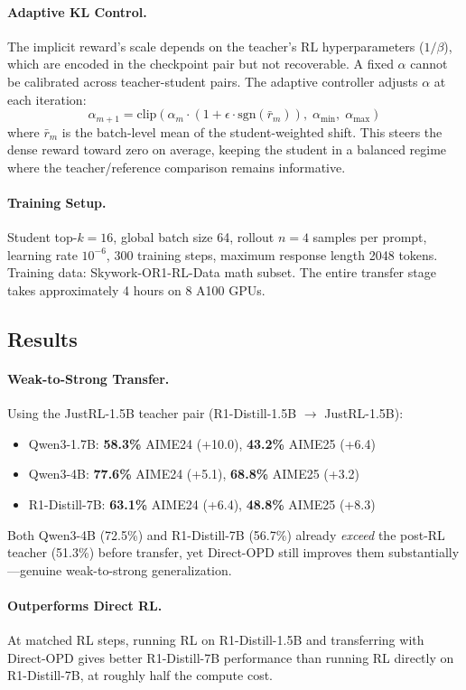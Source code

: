 \documentclass[11pt,a4paper]{article}
\begin{document}
\paragraph{Adaptive KL Control.} The implicit reward's scale depends on the teacher's RL hyperparameters ($1/\beta$), which are encoded in the checkpoint pair but not recoverable. A fixed $\alpha$ cannot be calibrated across teacher-student pairs. The adaptive controller adjusts $\alpha$ at each iteration:
\[
\alpha_{m+1} = \mathrm{clip}\!\left(\alpha_m \cdot (1 + \epsilon \cdot \mathrm{sgn}(\bar{r}_m)),\; \alpha_{\min},\; \alpha_{\max}\right)
\]
where $\bar{r}_m$ is the batch-level mean of the student-weighted shift. This steers the dense reward toward zero on average, keeping the student in a balanced regime where the teacher/reference comparison remains informative.

\paragraph{Training Setup.} Student top-$k = 16$, global batch size 64, rollout $n = 4$ samples per prompt, learning rate $10^{-6}$, 300 training steps, maximum response length 2048 tokens. Training data: Skywork-OR1-RL-Data math subset. The entire transfer stage takes approximately 4 hours on 8 A100 GPUs.

\subsection{Results}

\paragraph{Weak-to-Strong Transfer.} Using the JustRL-1.5B teacher pair (R1-Distill-1.5B $\to$ JustRL-1.5B):
\begin{itemize}
\item Qwen3-1.7B: \textbf{58.3\%} AIME24 (+10.0), \textbf{43.2\%} AIME25 (+6.4)
\item Qwen3-4B: \textbf{77.6\%} AIME24 (+5.1), \textbf{68.8\%} AIME25 (+3.2)
\item R1-Distill-7B: \textbf{63.1\%} AIME24 (+6.4), \textbf{48.8\%} AIME25 (+8.3)
\end{itemize}
Both Qwen3-4B (72.5\%) and R1-Distill-7B (56.7\%) already \emph{exceed} the post-RL teacher (51.3\%) before transfer, yet Direct-OPD still improves them substantially---genuine weak-to-strong generalization.

\paragraph{Outperforms Direct RL.} At matched RL steps, running RL on R1-Distill-1.5B and transferring with Direct-OPD gives better R1-Distill-7B performance than running RL directly on R1-Distill-7B, at roughly half the compute cost.
\end{document}
